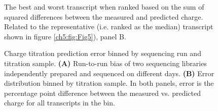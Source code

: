 \begin{figure}[ht]
    \centering
    \caption[Best and worst fitting transcripts for charge titration.]{
    The best and worst transcript when ranked based on the sum of squared differences between the measured and predicted charge.
    Related to the representative (i.e. ranked as the median) transcript shown in figure \ref{ch5:fig:Fig5}), panel B.
    }
    \label{ch5:figsupp:f5S1}
\end{figure}


\begin{figure}[ht]
    \centering
    \caption[Error binned by sequencing run and titration sample.]{
    Charge titration prediction error binned by sequencing run and titration sample.
    \textbf{(A)} Run-to-run bias of two sequencing libraries independently prepared and sequenced on different days.
    \textbf{(B)} Error distribution binned by titration sample.
    In both panels, error is the percentage point difference between the measured vs. predicted charge for all transcripts in the bin.
    }
    \label{ch5:figsupp:f5S2}
\end{figure}


